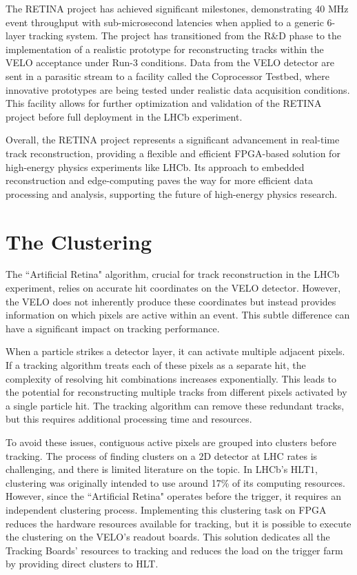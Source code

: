 The RETINA project has achieved significant milestones, demonstrating 40 MHz event throughput with sub-microsecond latencies when applied to a generic 6-layer tracking system. The project has transitioned from the R\&D phase to the implementation of a realistic prototype for reconstructing tracks within the VELO acceptance under Run-3 conditions. Data from the VELO detector are sent in a parasitic stream to a facility called the Coprocessor Testbed, where innovative prototypes are being tested under realistic data acquisition conditions. This facility allows for further optimization and validation of the RETINA project before full deployment in the LHCb experiment.

Overall, the RETINA project represents a significant advancement in real-time track reconstruction, providing a flexible and efficient FPGA-based solution for high-energy physics experiments like LHCb. Its approach to embedded reconstruction and edge-computing paves the way for more efficient data processing and analysis, supporting the future of high-energy physics research.

\section{The Clustering}

The ``Artificial Retina" algorithm, crucial for track reconstruction in the LHCb experiment, relies on accurate hit coordinates on the VELO detector. However, the VELO does not inherently produce these coordinates but instead provides information on which pixels are active within an event. This subtle difference can have a significant impact on tracking performance.

When a particle strikes a detector layer, it can activate multiple adjacent pixels. If a tracking algorithm treats each of these pixels as a separate hit, the complexity of resolving hit combinations increases exponentially. This leads to the potential for reconstructing multiple tracks from different pixels activated by a single particle hit. The tracking algorithm can remove these redundant tracks, but this requires additional processing time and resources.

To avoid these issues, contiguous active pixels are grouped into clusters before tracking. The process of finding clusters on a $2$D detector at LHC rates is challenging, and there is limited literature on the topic. In LHCb's HLT$1$, clustering was originally intended to use around 17\% of its computing resources. However, since the ``Artificial Retina" operates before the trigger, it requires an independent clustering process. Implementing this clustering task on FPGA reduces the hardware resources available for tracking, but it is possible to execute the clustering on the VELO's readout boards. This solution dedicates all the Tracking Boards' resources to tracking and reduces the load on the trigger farm by providing direct clusters to HLT.

